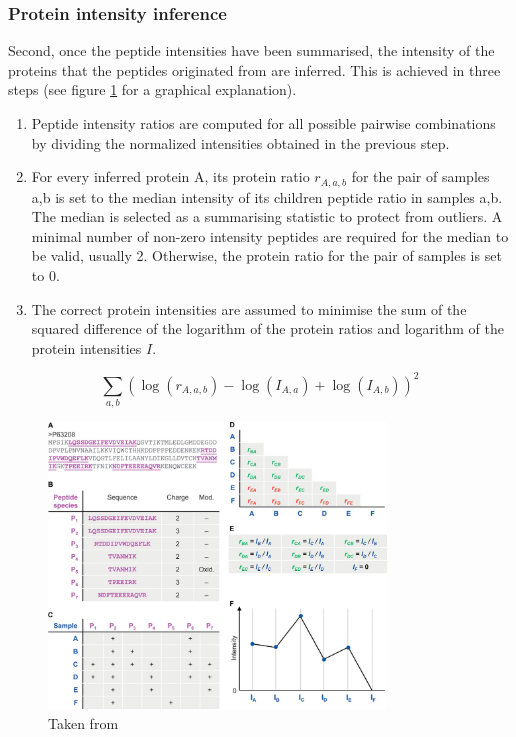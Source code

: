 \documentclass[11pt, a4paper]{report}
\begin{document}
\subsubsection{Protein intensity inference}

Second, once the peptide intensities have been summarised, the intensity of the proteins that the peptides originated from are inferred. This is achieved in three steps (see figure \ref{figure:protein_quant_inference} for a graphical explanation).

\begin{enumerate}
\item Peptide intensity ratios are computed for all possible pairwise combinations by dividing the normalized intensities obtained in the previous step.

\item For every inferred protein A, its protein ratio $r_{A, a,b}$ for the pair of samples a,b is set to the median intensity of its children peptide ratio in samples a,b. The median is selected as a summarising statistic to protect from outliers. A minimal number of non-zero intensity peptides are required for the median to be valid, usually 2. Otherwise, the protein ratio for the pair of samples is set to 0.

\item The correct protein intensities are assumed to minimise the sum of the squared difference of the logarithm of the protein ratios and logarithm of the protein intensities $I$.

\end{enumerate}

\begin{equation}\label{eq:least_squares}
\sum_{a,b} (\log{(r_{A, a,b})} - \log{(I_{A,a})} + \log{(I_{A,b})})^2
\end{equation}

\begin{figure}[!h]
\centering
\includegraphics[width=0.8\textwidth]{protein_quant_inference}
\caption{Taken from \cite{Cox2014}}
\label{figure:protein_quant_inference}
\end{figure}
\end{document}
